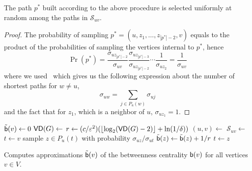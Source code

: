 \begin{lemma}\label{lem:samplpath}
  The path $p^*$ built according to the above procedure is selected uniformly at
  random among the paths in $\mathcal{S}_{uv}$.
\end{lemma}

\begin{proof}
  The probability of sampling $p^*=(u,z_1,\dotsc,z_{|p^*|-2},v)$ equals to the
  product of the probabilities of sampling the vertices internal to $p^*$, hence
  \[
  \Pr(p^*)=\frac{\sigma_{uz_{|p^*|-2}}}{\sigma_{uv}}\frac{\sigma_{uz_{|p^*|-3}}}{\sigma_{uz_{|p^*|-2}}}\dotsb
  \frac{1}{\sigma_{uz_2}}=\frac{1}{\sigma_{uv}}
  \]
  where we used~\citep[Lemma3]{Brandes01} which gives us the following expression 
  about the number of shortest paths for $w\neq u$,
  \[
  \sigma_{uw}=\sum_{j\in P_u(w)}\sigma_{uj}
  \]
  and the fact that for $z_1$, which is a neighbor of $u$, $\sigma_{uz_1}=1$.
\end{proof}

\begin{algorithm}[ht]
   \DontPrintSemicolon
  {
  $\tilde{\mathsf{b}}(v)\leftarrow 0$
  }
  $\mathsf{VD}(G)\leftarrow$\label{alg:diamcomp}\; 
  $r\leftarrow (c/\varepsilon^2)(\lfloor\log_2(\mathsf{VD}(G)-2)\rfloor+\ln(1/\delta))$\;
  {\label{algline:forloop}
  $(u,v)\leftarrow$\label{algline:samplevertices}\;
  $\mathcal{S}_{uv}\leftarrow$\label{algline:shortestpaths}\;
  {
  $t\leftarrow v$\;
   {
  sample $z\in P_u(t)$ with probability $\sigma_{uz}/\sigma_{ut}$\;
   {
  $\tilde{\mathsf{b}}(z) \leftarrow \tilde{\mathsf{b}}(z)+1/r$\;
  }
  $t\leftarrow z$\;
  }
  }
  } %
  \caption{Computes approximations $\tilde{\mathsf{b}}(v)$ of the betweenness
  centrality $\mathsf{b}(v)$ for all vertices $v\in V$.}
  \label{alg:algorithm}
\end{algorithm}

